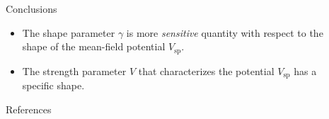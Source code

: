 \documentclass[final]{beamer}
\newlength{\sepwidth}
\newlength{\colwidth}
\newcommand{\separatorcolumn}{\begin{column}{\sepwidth}\end{column}}
\begin{document}
\begin{frame}[t]
\begin{columns}[t]
\begin{column}{\colwidth}
    \begin{block}{Conclusions}
    \begin{itemize}
    \item The shape parameter $\gamma$ is more \emph{sensitive} quantity with respect to the shape of the mean-field potential $V_\text{sp}$.
        \item The strength parameter $V$ that characterizes the potential $V_\text{sp}$ has a specific shape.
    \end{itemize}
  \end{block}

  \begin{block}{References}

    \nocite{*}
    \tiny{}

  \end{block}

\end{column}

\separatorcolumn

\end{columns}

\end{frame}
\end{document}
